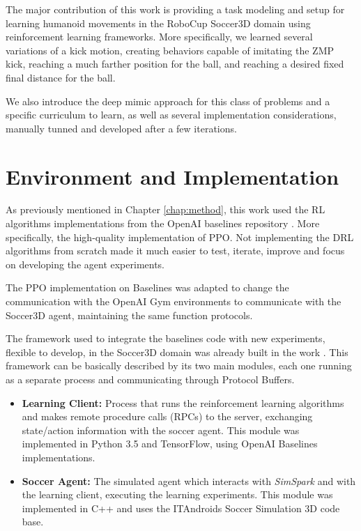 
The major contribution of this work is providing a task modeling and setup for learning humanoid  movements in the RoboCup Soccer3D domain using reinforcement learning frameworks. More specifically, we learned several variations of a kick motion, creating behaviors capable of imitating the ZMP kick, reaching a much farther position for the ball, and reaching a desired fixed final distance for the ball.


We also introduce the deep mimic approach for this class of problems and a specific curriculum to learn, as well as several implementation considerations, manually tunned and developed after a few iterations.

\section{Environment and Implementation}

As previously mentioned in Chapter \ref{chap:method}, this work used the RL algorithms implementations from the OpenAI baselines repository \cite{baselines}. More specifically, the high-quality implementation of PPO. Not implementing the DRL algorithms from scratch made it much easier to test, iterate, improve and focus on developing the agent experiments.

The PPO implementation on Baselines was adapted to change the communication with the OpenAI Gym environments to communicate with the Soccer3D agent, maintaining the same function protocols.

The framework used to integrate the baselines code with new experiments, flexible to develop, in the Soccer3D domain was already built in the work \cite{TGMuzio}. This framework can be basically described by its two main modules, each one running as a separate process and communicating through Protocol Buffers.

\begin{itemize}
\item \textbf{Learning Client:} Process that runs the reinforcement learning algorithms and makes remote procedure calls (RPCs) to the server, exchanging state/action information with the soccer agent. This module was implemented in Python 3.5 and TensorFlow, using OpenAI Baselines implementations.

\item \textbf{Soccer Agent:} The simulated agent which interacts with \textit{SimSpark} and with the learning client, executing the learning experiments. This module was implemented in C++ and uses the ITAndroids Soccer Simulation 3D code base.
\end{itemize}

